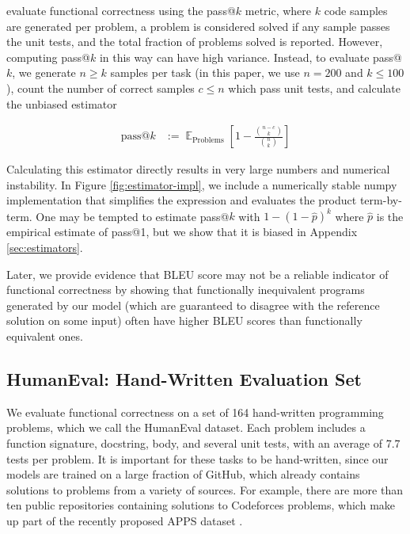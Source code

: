 \citet{kulal2019spoc} evaluate functional correctness using the pass@$k$ metric, where $k$ code samples are generated per problem, a problem is considered solved if any sample passes the unit tests, and the total fraction of problems solved is reported. However, computing pass@$k$ in this way can have high variance. Instead, to evaluate pass@$k$, we generate $n \geq k$ samples per task (in this paper, we use $n=200$ and $k \leq 100$), count the number of correct samples $c \leq n$ which pass unit tests, and calculate the unbiased estimator

\begin{align}
\text{pass@$k$} &:= \mathop{\mathbb{E}}_{\text{Problems}} \left[ 1 - \frac{{\binom{n-c}{k}}} {\binom{n}{k}} \right]
\label{eq:estimator}
\end{align}

Calculating this estimator directly results in very large numbers and numerical instability. In Figure \ref{fig:estimator-impl}, we include a numerically stable numpy implementation that simplifies the expression and evaluates the product term-by-term. One may be tempted to estimate pass@$k$ with $1 - (1 - \hat p)^k$ where $\hat p$ is the empirical estimate of pass@1, but we show that it is biased in Appendix \ref{sec:estimators}.

Later, we provide evidence that BLEU score may not be a reliable indicator of functional correctness by showing that functionally inequivalent programs generated by our model (which are guaranteed to disagree with the reference solution on some input) often have higher BLEU scores than functionally equivalent ones.

\subsection{HumanEval: Hand-Written Evaluation Set}
\label{sec:eval:humaneval}

We evaluate functional correctness on a set of 164 hand-written programming problems, which we call the HumanEval dataset. Each problem includes a function signature, docstring, body, and several unit tests, with an average of 7.7 tests per problem. It is important for these tasks to be hand-written, since our models are trained on a large fraction of GitHub, which already contains solutions to problems from a variety of sources. For example, there are more than ten public repositories containing solutions to Codeforces problems, which make up part of the recently proposed APPS dataset \citep{hendrycks2021apps}.

